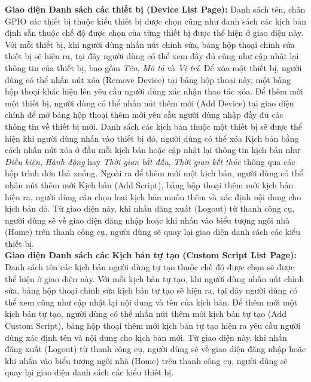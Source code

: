\documentclass[12pt,a4paper,oneside]{extbook}
\begin{document}
\noindent
\textbf{Giao diện Danh sách các thiết bị (Device List Page):} Danh sách tên, chân GPIO các thiết bị thuộc kiểu thiết bị được chọn cũng như danh sách các kịch bản định sẵn thuộc chế độ được chọn của từng thiết bị được thể hiện ở giao diện này. Với mỗi thiết bị, khi người dùng nhấn nút chỉnh sửa, bảng hộp thoại chỉnh sửa thiết bị sẽ hiện ra, tại đây người dùng có thể xem đầy đủ cũng như cập nhật lại thông tin của thiết bị, bao gồm \textit{Tên}, \textit{Mô tả} và \textit{Vị trí}. Để xóa một thiết bị, người dùng có thể nhấn nút xóa (Remove Device) tại bảng hộp thoại này, một bảng hộp thoại khác hiện lên yêu cầu người dùng xác nhận thao tác xóa. Để thêm mới một thiết bị, người dùng có thể nhấn nút thêm mới (Add Device) tại giao diện chính để mở bảng hộp thoại thêm mới yêu cầu người dùng nhập đầy đủ các thông tin về thiết bị mới. Danh sách các kịch bản thuộc một thiết bị sẽ được thể hiện khi người dùng nhấn vào thiết bị đó, người dùng có thể xóa Kịch bản bằng cách nhấn nút xóa ở đầu mỗi kịch bản hoặc cập nhật lại thông tin kịch bản như \textit{Điều kiện}, \textit{Hành động} hay \textit{Thời gian bắt đầu}, \textit{Thời gian kết thúc} thông qua các hộp trình đơn thả xuống. Ngoài ra để thêm mới một kịch bản, người dùng có thể nhấn nút thêm mới Kịch bản (Add Script), bảng hộp thoại thêm mới kịch bản hiện ra, người dùng cần chọn loại kịch bản muốn thêm và xác định nội dung cho kịch bản đó. Từ giao diện này, khi nhấn đăng xuất (Logout) từ thanh công cụ, người dùng sẽ về giao diện đăng nhập hoặc khi nhấn vào biểu tượng ngôi nhà (Home) trên thanh công cụ, người dùng sẽ quay lại giao diện danh sách các kiểu thiết bị.\\

\noindent
\textbf{Giao diện Danh sách các Kịch bản tự tạo (Custom Script List Page):} Danh sách tên các kịch bản người dùng tự tạo thuộc chế độ được chọn sẽ được thể hiện ở giao diện này. Với mỗi kịch bản tự tạo, khi người dùng nhấn nút chỉnh sửa, bảng hộp thoại chỉnh sửa kịch bản tự tạo sẽ hiện ra, tại đây người dùng có thể xem cũng như cập nhật lại nội dung và tên của kịch bản. Để thêm mới một kịch bản tự tạo, người dùng có thể nhấn nút thêm mới kịch bản tự tạo (Add Custom Script), bảng hộp thoại thêm mới kịch bản tự tạo hiện ra yêu cầu người dùng xác định tên và nội dung cho kịch bản mới. Từ giao diện này, khi nhấn đăng xuất (Logout) từ thanh công cụ, người dùng sẽ về giao diện đăng nhập hoặc khi nhấn vào biểu tượng ngôi nhà (Home) trên thanh công cụ, người dùng sẽ quay lại giao diện danh sách các kiểu thiết bị.\\
\end{document}
